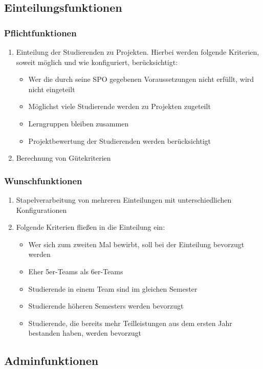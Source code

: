 \documentclass[parskip=full]{scrartcl}
\newcommand{\swtLabel}[1]{\textbf{/#1\arabic*0/}}
\begin{document}
\subsection{Einteilungsfunktionen}
\subsubsection{Pflichtfunktionen}
\begin{enumerate}[label=\swtLabel{FA}]
  \item Einteilung der Studierenden zu Projekten. Hierbei werden folgende Kriterien,
soweit möglich und wie konfiguriert, berücksichtigt:
\begin{itemize}
  \item Wer die durch seine SPO gegebenen Voraussetzungen nicht erfüllt, wird nicht
eingeteilt
\item Möglichst viele Studierende werden zu Projekten zugeteilt
\item Lerngruppen bleiben zusammen
\item Projektbewertung der Studierenden werden berücksichtigt
\end{itemize}
\item Berechnung von Gütekriterien
\end{enumerate}
\subsubsection{Wunschfunktionen}
\begin{enumerate}[label=\swtLabel{FA}, resume]
  \item Stapelverarbeitung von mehreren Einteilungen mit unterschiedlichen Konfigurationen
\item Folgende Kriterien fließen in die Einteilung ein:
\begin{itemize}
  \item Wer sich zum zweiten Mal bewirbt, soll bei der Einteilung bevorzugt
  werden
  \item Eher 5er-Teams als 6er-Teams
  \item Studierende in einem Team sind im gleichen Semester
  \item Studierende höheren Semesters werden bevorzugt
  \item Studierende, die bereits mehr Teilleistungen aus dem ersten Jahr bestanden
haben, werden bevorzugt
\end{itemize}
\end{enumerate}
\subsection{Adminfunktionen}
\end{document}
